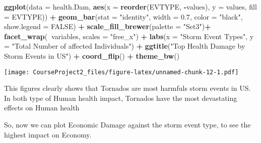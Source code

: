 \documentclass[]{article}
\newenvironment{Shaded}{\begin{snugshade}}{\end{snugshade}}
\newcommand{\KeywordTok}[1]{\textcolor[rgb]{0.13,0.29,0.53}{\textbf{#1}}}
\newcommand{\DataTypeTok}[1]{\textcolor[rgb]{0.13,0.29,0.53}{#1}}
\newcommand{\FloatTok}[1]{\textcolor[rgb]{0.00,0.00,0.81}{#1}}
\newcommand{\StringTok}[1]{\textcolor[rgb]{0.31,0.60,0.02}{#1}}
\newcommand{\OtherTok}[1]{\textcolor[rgb]{0.56,0.35,0.01}{#1}}
\newcommand{\OperatorTok}[1]{\textcolor[rgb]{0.81,0.36,0.00}{\textbf{#1}}}
\newcommand{\NormalTok}[1]{#1}
\begin{document}
\begin{Shaded}
\begin{Highlighting}[]
\KeywordTok{ggplot}\NormalTok{(}\DataTypeTok{data =}\NormalTok{ health.Dam, }\KeywordTok{aes}\NormalTok{(}\DataTypeTok{x =} \KeywordTok{reorder}\NormalTok{(EVTYPE, }\OperatorTok{-}\NormalTok{values), }\DataTypeTok{y =}\NormalTok{ values, }\DataTypeTok{fill =}\NormalTok{ EVTYPE)) }\OperatorTok{+}\StringTok{ }
\StringTok{      }\KeywordTok{geom_bar}\NormalTok{(}\DataTypeTok{stat =} \StringTok{"identity"}\NormalTok{, }\DataTypeTok{width =} \FloatTok{0.7}\NormalTok{, }\DataTypeTok{color =} \StringTok{"black"}\NormalTok{, }\DataTypeTok{show.legend =} \OtherTok{FALSE}\NormalTok{) }\OperatorTok{+}\StringTok{ }
\StringTok{      }\KeywordTok{scale_fill_brewer}\NormalTok{(}\DataTypeTok{palette =} \StringTok{"Set3"}\NormalTok{)}\OperatorTok{+}
\StringTok{      }\KeywordTok{facet_wrap}\NormalTok{(}\OperatorTok{~}\NormalTok{variables, }\DataTypeTok{scales =} \StringTok{"free_x"}\NormalTok{) }\OperatorTok{+}
\StringTok{      }\KeywordTok{labs}\NormalTok{(}\DataTypeTok{x =} \StringTok{"Storm Event Types"}\NormalTok{, }\DataTypeTok{y =} \StringTok{"Total Number of affected Individuals"}\NormalTok{) }\OperatorTok{+}\StringTok{ }
\StringTok{      }\KeywordTok{ggtitle}\NormalTok{(}\StringTok{"Top Health Damage by Storm Events in US"}\NormalTok{) }\OperatorTok{+}\StringTok{ }
\StringTok{      }\KeywordTok{coord_flip}\NormalTok{() }\OperatorTok{+}
\StringTok{      }\KeywordTok{theme_bw}\NormalTok{()}
\end{Highlighting}
\end{Shaded}

\texttt{[image: CourseProject2\_files/figure-latex/unnamed-chunk-12-1.pdf]}

This figures clearly shows that Tornados are most harmfuls storm events
in US. In both type of Human health impact, Tornados have the most
devastating effects on Human health

So, now we can plot Economic Damage against the storm event type, to see
the highest impact on Economy.
\end{document}
